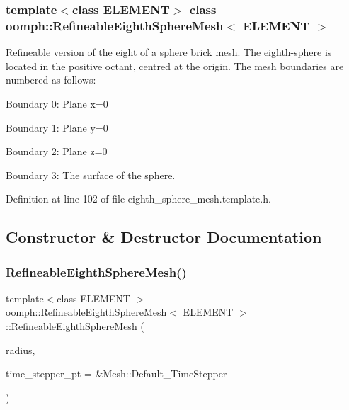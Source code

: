 \subsubsection*{template$<$class E\+L\+E\+M\+E\+NT$>$\newline
class oomph\+::\+Refineable\+Eighth\+Sphere\+Mesh$<$ E\+L\+E\+M\+E\+N\+T $>$}

Refineable version of the eight of a sphere brick mesh. The eighth-\/sphere is located in the positive octant, centred at the origin. The mesh boundaries are numbered as follows\+:
\begin{DoxyItemize}
\item Boundary 0\+: Plane x=0
\item Boundary 1\+: Plane y=0
\item Boundary 2\+: Plane z=0
\item Boundary 3\+: The surface of the sphere. 
\end{DoxyItemize}

Definition at line 102 of file eighth\+\_\+sphere\+\_\+mesh.\+template.\+h.



\subsection{Constructor \& Destructor Documentation}
\mbox{\label{classoomph_1_1RefineableEighthSphereMesh_a975d12a45de7356f50bd69f3197659aa}} 
\subsubsection{\texorpdfstring{Refineable\+Eighth\+Sphere\+Mesh()}{RefineableEighthSphereMesh()}}
{\footnotesize\ttfamily template$<$class E\+L\+E\+M\+E\+NT $>$ \\
\hyperlink{classoomph_1_1RefineableEighthSphereMesh}{oomph\+::\+Refineable\+Eighth\+Sphere\+Mesh}$<$ E\+L\+E\+M\+E\+NT $>$\+::\hyperlink{classoomph_1_1RefineableEighthSphereMesh}{Refineable\+Eighth\+Sphere\+Mesh} (\begin{DoxyParamCaption}\item[{const double \&}]{radius,  }\item[{Time\+Stepper $\ast$}]{time\+\_\+stepper\+\_\+pt = {\ttfamily \&Mesh\+:\+:Default\+\_\+TimeStepper} }\end{DoxyParamCaption})\hspace{0.3cm}{\ttfamily [inline]}}



